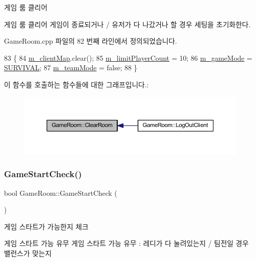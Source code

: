 게임 룸 클리어 

게임 룸 클리어  게임이 종료되거나 / 유저가 다 나갔거나 할 경우 세팅을 초기화한다. 

Game\+Room.\+cpp 파일의 82 번째 라인에서 정의되었습니다.


\begin{DoxyCode}
83 \{
84     \hyperlink{class_game_room_afc202a511605453216f7dd870ff96c5c}{m\_clientMap}.clear();
85     \hyperlink{class_game_room_ae03c39da189ee9097af8ee4cde8ba373}{m\_limitPlayerCount} = 10;
86     \hyperlink{class_game_room_a47c8f21ede7fd6fa526ebfcb069dcf45}{m\_gameMode} = \hyperlink{stdafx_8h_aaf5ef5a17b53e9997c837b07015589dea556cddc3def0c450a439f11c260bd140}{SURVIVAL};
87     \hyperlink{class_game_room_aef7875998ee1bf83eb23e249b5659bc7}{m\_teamMode} = \textcolor{keyword}{false};
88 \}
\end{DoxyCode}
이 함수를 호출하는 함수들에 대한 그래프입니다.\+:\nopagebreak
\begin{figure}[H]
\begin{center}
\leavevmode
\includegraphics[width=350pt]{class_game_room_a3dd806c7382efd9ffd353ab152113d69_icgraph}
\end{center}
\end{figure}
\mbox{\label{class_game_room_ac260821efc332ce039a4bd82aba5a828}} 
\subsubsection{\texorpdfstring{Game\+Start\+Check()}{GameStartCheck()}}
{\footnotesize\ttfamily bool Game\+Room\+::\+Game\+Start\+Check (\begin{DoxyParamCaption}{ }\end{DoxyParamCaption})}



게임 스타트가 가능한지 체크 

게임 스타트 가능 유무  게임 스타트 가능 유무 \+: 레디가 다 눌려있는지 / 팀전일 경우 밸런스가 맞는지

